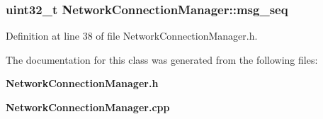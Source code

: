 \subsubsection[{msg\-\_\-seq}]{\setlength{\rightskip}{0pt plus 5cm}uint32\-\_\-t {\bf \-Network\-Connection\-Manager\-::msg\-\_\-seq}\hspace{0.3cm}{\ttfamily  [private]}}\label{classNetworkConnectionManager_a8e7d07af1f0abc1b2114e03b743b4c13}


\-Definition at line 38 of file \-Network\-Connection\-Manager.\-h.



\-The documentation for this class was generated from the following files\-:\begin{DoxyCompactItemize}
\item 
{\bf \-Network\-Connection\-Manager.\-h}\item 
{\bf \-Network\-Connection\-Manager.\-cpp}\end{DoxyCompactItemize}
